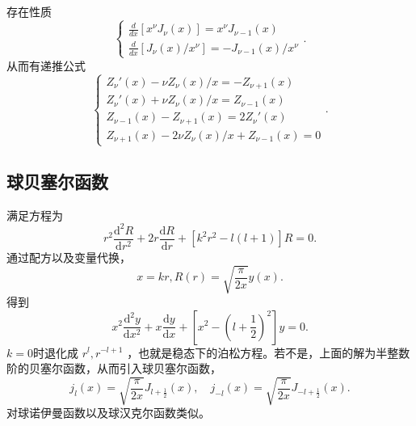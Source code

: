 \documentclass[12pt,a4paper,openany,twoside]{book}
\numberwithin{equation}{section}
\begin{document}
          存在性质
          \begin{equation}
          \begin{cases}
            \frac{d }{d x} [x^\nu J_\nu (x) ] = x^\nu J_{\nu-1} (x) \\
            \frac{d }{d x} [J_\nu (x) /x^\nu] = -J_{\nu-1} (x) /x^\nu  
          \end{cases}
          .
          \end{equation} 
          从而有递推公式
          \begin{equation}
          \begin{cases}
            Z_\nu'(x) - \nu Z_\nu(x) /x = - Z_{\nu+1} (x) \\
            Z_\nu'(x) + \nu Z_\nu(x) /x = Z_{\nu-1} (x) \\
            Z_{\nu-1} (x) - Z_{\nu+1} (x) = 2Z_\nu'(x) \\
            Z_{\nu+1} (x) - 2\nu Z_\nu(x) / x + Z_{\nu-1} (x) = 0
          \end{cases}
          .
          \end{equation} 

        \subsection{球贝塞尔函数}
          满足方程为
          \begin{equation}
            r^2 \frac{\mathrm{d} ^2R}{\mathrm{d} r^2} + 2r \frac{\mathrm{d} R}{\mathrm{d} r}  + [k^2r^2-l(l+1)] R = 0 
          .
          \end{equation}
          通过配方以及变量代换，
           \begin{equation}
             x = kr , R(r) = \sqrt{\frac{\pi}{2x}} y(x) 
          .
          \end{equation} 
          得到
           \begin{equation}
             x^2\frac{\mathrm{d} ^2y}{\mathrm{d} x^2}  + x \frac{\mathrm{d} y}{\mathrm{d} x}  + \left[ x^2 - \left( l+\frac{1}{2} \right) ^2 \right] y = 0
          .
          \end{equation} 
          $k=0$时退化成 $r^l,r^{-l+1}$ ，也就是稳态下的泊松方程。若不是，上面的解为半整数阶的贝塞尔函数，从而引入球贝塞尔函数，
          \begin{equation}
            j_l(x) = \sqrt{\frac{\pi}{2x}} J_{l+\frac{1}{2}}(x), \quad j_{-l} (x) = \sqrt{\frac{\pi}{2x}}J_{-l+\frac{1}{2}} (x)
          .
          \end{equation}
          对球诺伊曼函数以及球汉克尔函数类似。
\end{document}
